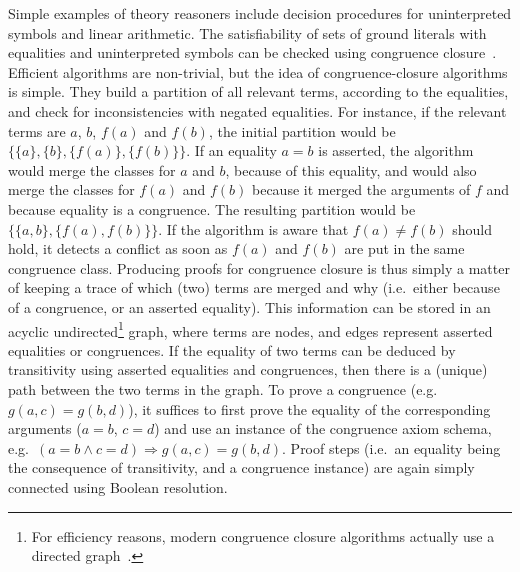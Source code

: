 \documentclass{llncs}
\begin{document}
Simple examples of theory reasoners include decision procedures for
uninterpreted symbols and linear arithmetic.
The satisfiability of sets of ground literals with equalities and uninterpreted
symbols can be checked using congruence
closure~\cite{Nelson2,Nieuwenhuis3,Nieuwenhuis6}.  Efficient algorithms are
non-trivial, but the idea of congruence-closure algorithms is simple.  They
build a 
partition of all relevant terms, according to the equalities, and check for
inconsistencies with negated equalities.  For instance, if the relevant terms
are $a$, $b$, $f(a)$ and $f(b)$, the initial partition would be $\big\{\{a\},
\{b\}, \{f(a)\}, \{f(b)\}\big\}$.  If an equality $a=b$ is asserted, the
algorithm would merge the classes for $a$ and $b$, because of this equality, and
would also merge the classes for $f(a)$ and $f(b)$ because it merged the
arguments of $f$ and because equality is a congruence.  The resulting partition would be $\big\{\{a, b\}, \{f(a), f(b)\}\big\}$.  If the algorithm is
aware that $f(a) \neq f(b)$ should hold, it detects a conflict as soon as $f(a)$
and $f(b)$ are put in the same congruence class.  Producing proofs for congruence
closure is thus simply a matter of keeping a trace of which (two) terms are merged
and why (i.e.\ either because of a congruence, or an asserted equality).  This
information can be stored in an acyclic undirected\footnote{For efficiency
  reasons, modern congruence closure algorithms actually use a directed
  graph~\cite{Nieuwenhuis6}.} graph, where terms are nodes, and edges represent
asserted equalities or congruences.  If the equality of two terms can be deduced
by transitivity using asserted equalities and congruences, then there is a
(unique) path between the two terms in the graph.  To prove a congruence
(e.g.\ $g(a,c) = g(b,d)$), it suffices to first prove the equality of the
corresponding arguments ($a=b$, $c=d$) and use an instance of the congruence
axiom schema, e.g.\ $(a=b \wedge c=d) \Rightarrow g(a,c) = g(b,d)$.  Proof
steps (i.e.\ an equality being the consequence of transitivity, and a congruence
instance) are again simply connected using Boolean resolution.
\end{document}
